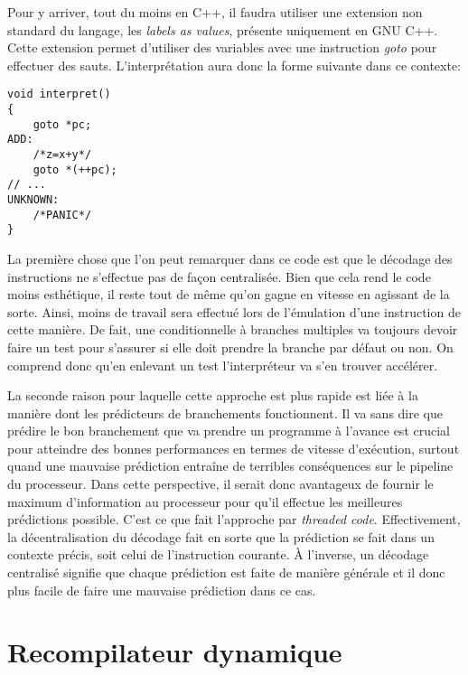 \documentclass{article} %
\begin{document}
Pour y arriver, tout du moins en C++, il faudra utiliser une extension non standard du langage, les \textit{labels as values}, présente uniquement en GNU C++. Cette extension permet d'utiliser des variables avec une instruction \textit{goto} pour effectuer des sauts. L'interprétation aura donc la forme suivante dans ce contexte:

\begin{lstlisting}
void interpret()
{
    goto *pc;
ADD:
    /*z=x+y*/
    goto *(++pc);
// ...
UNKNOWN:
    /*PANIC*/
}

\end{lstlisting}

La première chose que l'on peut remarquer dans ce code est que le décodage des instructions ne s'effectue pas de façon centralisée. Bien que cela rend le code moins esthétique, il reste tout de même qu'on gagne en vitesse en agissant de la sorte. Ainsi, moins de travail sera effectué lors de l'émulation d'une instruction de cette manière. De fait, une conditionnelle à branches multiples va toujours devoir faire un test pour s'assurer si elle doit prendre la branche par défaut ou non. On comprend donc qu'en enlevant un test l'interpréteur va s'en trouver accélérer.

La seconde raison pour laquelle cette approche est plus rapide est liée à la manière dont les prédicteurs de branchements fonctionnent. Il va sans dire que prédire le bon branchement que va prendre un programme à l'avance est crucial pour atteindre des bonnes performances en termes de vitesse d'exécution, surtout quand une mauvaise prédiction entraîne de terribles conséquences sur le pipeline du processeur. Dans cette perspective, il serait donc avantageux de fournir le maximum d'information au processeur pour qu'il effectue les meilleures prédictions possible. C'est ce que fait l'approche par \textit{threaded code}. Effectivement, la décentralisation du décodage fait en sorte que la prédiction se fait dans un contexte précis, soit celui de l'instruction courante. À l'inverse, un décodage centralisé signifie que chaque prédiction est faite de manière générale et il donc plus facile de faire une mauvaise prédiction dans ce cas.

\section{Recompilateur dynamique}
\end{document}
